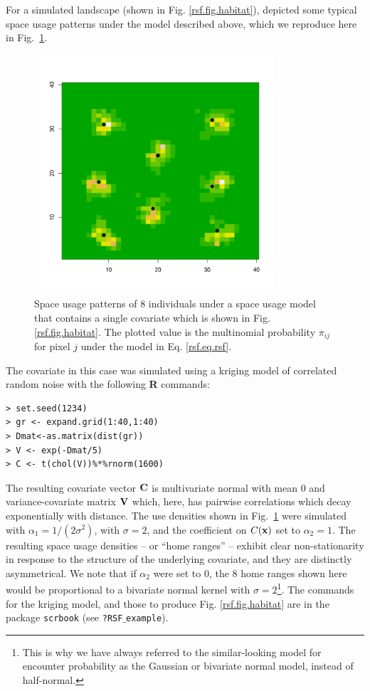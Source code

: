 For a simulated landscape (shown in Fig. \ref{rsf.fig.habitat}),
\citet{royle_etal:2012mee} depicted some typical space
usage patterns under the model described above, which we reproduce
here in Fig.~\ref{rsf.fig.homeranges}.
\begin{figure}[ht]
\centering
\includegraphics[width=3.5in,height=3.5in]{Ch13-RSF/figs/homeranges8}
\caption{Space usage patterns of 8 individuals under a space usage
  model that contains a single covariate which is shown in
  Fig. \ref{rsf.fig.habitat}. The plotted value is the multinomial
  probability $\pi_{ij}$ for pixel $j$ under the model in Eq. \ref{rsf.eq.rsf}.
}
\label{rsf.fig.homeranges}
\end{figure}
The covariate in this case was simulated using a kriging
model of correlated random noise
with the following {\bf R} commands:
\begin{verbatim}
> set.seed(1234)
> gr <- expand.grid(1:40,1:40)
> Dmat<-as.matrix(dist(gr))
> V <- exp(-Dmat/5)
> C <- t(chol(V))%*%rnorm(1600)
\end{verbatim}
The resulting covariate vector ${\bf C}$ is multivariate normal with
mean 0 and variance-covariate matrix ${\bf V}$ which, here, has
pairwise correlations which decay exponentially with distance.  The
use densities shown in Fig.~\ref{rsf.fig.homeranges} were simulated
with $\alpha_{1} = 1/(2\sigma^2)$, with $\sigma = 2$, and the
coefficient on $C({\bf x})$ set to $\alpha_{2} = 1$. The resulting
space usage densities -- or ``home ranges'' -- exhibit clear
non-stationarity in response to the structure of the underlying
covariate, and they are distinctly asymmetrical.  We note that if
$\alpha_{2}$ were set to 0, the 8 home ranges shown here would be
proportional to a bivariate normal kernel with $\sigma =
2$\footnote{This is why we have always referred to the similar-looking
  model for encounter probability as the Gaussian or bivariate normal
  model, instead of half-normal.}.  The commands for the kriging
model, and those to produce Fig. \ref{rsf.fig.habitat} are in the
package \mbox{\tt scrbook} (see \mbox{\tt ?RSF$\_$example}).


